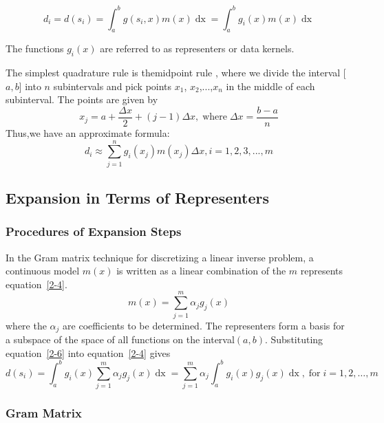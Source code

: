 \documentclass[a4paper]{article}
\newcommand{\tmem}[1]{{\em #1\/}}
\newcommand{\tmop}[1]{\ensuremath{\operatorname{#1}}}
\begin{document}
{\tmem{\begin{equation}
  d_i = d (s_i) = \int_a^b g (s_i, x) m (x) \tmop{dx} = \int_a^b g_i (x) m (x)
  \tmop{dx}
  \label{2-4}
\end{equation}}}

The functions $g_i (x)$ are referred to as representers or data kernels.

The simplest quadrature rule is themidpoint rule , where we divide the
interval [$a, b$] into $n$ subintervals and pick points $x_1$, $x_2$,...,$x_n$
in the middle of each subinterval. The points are given by
\[ x_j = a + \frac{\Delta x}{2} + (j - 1) \Delta x, \tmop{where} \Delta x =
   \frac{b - a}{n} \]
Thus,we have an approximate formula:
\begin{equation}
  d_i \approx \sum^n_{j = 1} g_i (x_j) m (x_j) \Delta x, i = 1, 2, 3, ..., m
\end{equation}


\subsection{Expansion in Terms of Representers}

\subsubsection{Procedures of Expansion Steps}

In the Gram matrix technique for discretizing a linear inverse problem, a
continuous model $m (x)$ is written as a linear combination of the $m$
represents equation~\ref{2-4}.
\begin{equation}
  m (x) = \sum_{j = 1}^m \alpha_j g_j (x)
  \label{2-6}
\end{equation}
where the $\alpha_j$ are coefficients to be determined. The representers form
a basis for a subspace of the space of all functions on the interval$(a, b)$.
Substituting equation~\ref{2-6} into equation~\ref{2-4} gives
\begin{equation}
  d (s_i) = \int_a^b g_i \left( x \right) \sum_{j = 1}^m \alpha_j g_j \left( x
  \right) \tmop{dx} = \sum_{j = 1}^m \alpha_j \int_a^b g_i \left( x \right)
  g_j \left( x \right) \tmop{dx}, \tmop{for} i = 1, 2, \ldots, m
\end{equation}


\subsubsection{Gram Matrix}
\end{document}
